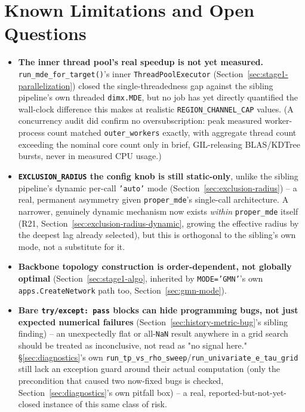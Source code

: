 \documentclass[11pt]{article}
\begin{document}
\newpage
\section{Known Limitations and Open Questions}
\label{sec:limitations}
\begin{itemize}
  \item \textbf{The inner thread pool's real speedup is not yet measured.} \texttt{run\_mde\_for\_target()}'s inner \texttt{ThreadPoolExecutor} (Section~\ref{sec:stage1-parallelization}) closed the single-threadedness gap against the sibling pipeline's own threaded \texttt{dimx.MDE}, but no job has yet directly quantified the wall-clock difference this makes at realistic \texttt{REGION\_CHANNEL\_CAP} values. (A concurrency audit did confirm no oversubscription: peak measured worker-process count matched \texttt{outer\_workers} exactly, with aggregate thread count exceeding the nominal core count only in brief, GIL-releasing BLAS/KDTree bursts, never in measured CPU usage.)
  \item \textbf{\texttt{EXCLUSION\_RADIUS} the config knob is still static-only}, unlike the sibling pipeline's dynamic per-call \texttt{'auto'} mode (Section~\ref{sec:exclusion-radius}) -- a real, permanent asymmetry given \texttt{proper\_mde}'s single-call architecture. A narrower, genuinely dynamic mechanism now exists \emph{within} \texttt{proper\_mde} itself (R21, Section~\ref{sec:exclusion-radius-dynamic}, growing the effective radius by the deepest lag already selected), but this is orthogonal to the sibling's own mode, not a substitute for it.
  \item \textbf{Backbone topology construction is order-dependent, not globally optimal} (Section~\ref{sec:stage1-algo}, inherited by \texttt{MODE='GMN'}'s own \texttt{apps.CreateNetwork} path too, Section~\ref{sec:gmn-mode}).
  \item \textbf{Bare \texttt{try/except: pass} blocks can hide programming bugs, not just expected numerical failures} (Section~\ref{sec:history-metric-bug}'s sibling finding) -- an unexpectedly flat or all-\texttt{NaN} result anywhere in a grid search should be treated as inconclusive, not read as "no signal here." \S\ref{sec:diagnostics}'s own \texttt{run\_tp\_vs\_rho\_sweep}/\texttt{run\_univariate\_e\_tau\_grid} still lack an exception guard around their actual computation (only the precondition that caused two now-fixed bugs is checked, Section~\ref{sec:diagnostics}'s own pitfall box) -- a real, reported-but-not-yet-closed instance of this same class of risk.

\end{itemize}
\end{document}
